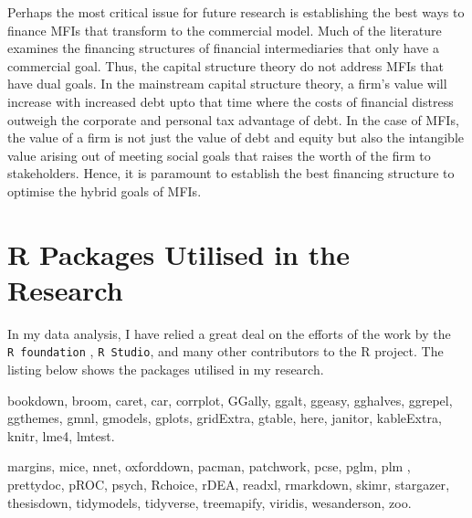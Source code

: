 \documentclass[a4paper, nobind]{templates/ociamthesis}
\begin{document}
Perhaps the most critical issue for future research is establishing the best ways to finance MFIs that transform to the commercial model. Much of the literature examines the financing structures of financial intermediaries that only have a commercial goal. Thus, the capital structure theory do not address MFIs that have dual goals. In the mainstream capital structure theory, a firm's value will increase with increased debt upto that time where the costs of financial distress outweigh the corporate and personal tax advantage of debt. In the case of MFIs, the value of a firm is not just the value of debt and equity but also the intangible value arising out of meeting social goals that raises the worth of the firm to stakeholders. Hence, it is paramount to establish the best financing structure to optimise the hybrid goals of MFIs.

\startappendices

\hypertarget{r-packages-utilised-in-the-research}{%
\chapter{R Packages Utilised in the Research}\label{r-packages-utilised-in-the-research}}

In my data analysis, I have relied a great deal on the efforts of the work by the \texttt{R\ foundation} \autocite{R}, \texttt{R\ Studio}, and many other contributors to the R project. The listing below shows the packages utilised in my research.

bookdown\autocite{bookdown},
broom\autocite{broom},
caret\autocite{caret},
car\autocite{car},
corrplot\autocite{corrplot2021},
GGally\autocite{ggally},
ggalt\autocite{ggalt},
ggeasy\autocite{ggeasy},
gghalves\autocite{gghalves},
ggrepel\autocite{ggrepel},
ggthemes\autocite{ggthemes},
gmnl\autocite{gmnl},
gmodels\autocite{gmodels},
gplots\autocite{gplots},
gridExtra\autocite{gridextra},
gtable\autocite{gtable},
here\autocite{here},
janitor\autocite{janitor},
kableExtra\autocite{kableExtra},
knitr\autocite{knitr},
lme4\autocite{lme4},
lmtest\autocite{lmtest}.

margins\autocite{margins},
mice\autocite{mice},
nnet\autocite{nnet},
oxforddown\autocite{lyngsOxforddown2019},
pacman\autocite{pacman},
patchwork\autocite{patchwork},
pcse\autocite{pcse},
pglm\autocite{pglm},
plm \autocite{plm},
prettydoc\autocite{prettydoc},
pROC\autocite{pROC},
psych\autocite{psych},
Rchoice\autocite{rchoice},
rDEA\autocite{rdea},
readxl\autocite{readxl},
rmarkdown\autocite{rmarkdown},
skimr\autocite{skimr},
stargazer\autocite{stargazer},
thesisdown\autocite{thesisdown2021},
tidymodels\autocite{tidymodels},
tidyverse\autocite{tidyverse},
treemapify\autocite{treemap},
viridis\autocite{viridis},
wesanderson\autocite{wesanderson},
zoo\autocite{zoo}.
\end{document}
